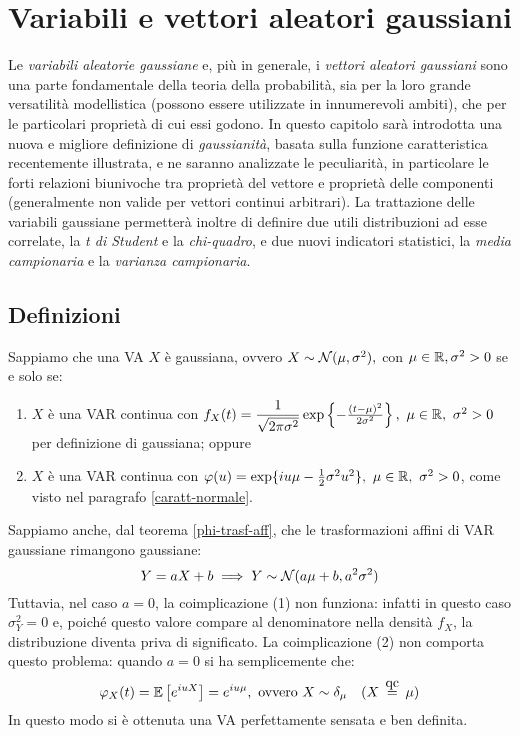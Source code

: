 \section{Variabili e vettori aleatori gaussiani}\label{variabli-vettori-gaussiani}
Le \emph{variabili aleatorie gaussiane} e, più in generale, i \emph{vettori aleatori gaussiani} sono una parte fondamentale della teoria della probabilità, sia per la loro grande versatilità modellistica (possono essere utilizzate in innumerevoli ambiti), che per le particolari proprietà di cui essi godono.
In questo capitolo sarà introdotta una nuova e migliore definizione di \emph{gaussianità}, basata sulla funzione caratteristica recentemente illustrata, e ne saranno analizzate le peculiarità, in particolare le forti relazioni biunivoche tra proprietà del vettore e proprietà delle componenti (generalmente non valide per vettori continui arbitrari).
La trattazione delle variabili gaussiane permetterà inoltre di definire due utili distribuzioni ad esse correlate, la \emph{\emph t di Student} e la \emph{chi-quadro}, e due nuovi indicatori statistici, la \emph{media campionaria} e la \emph{varianza campionaria}.

\subsection{Definizioni}
 Sappiamo che una VA $X$ è gaussiana, ovvero $X \sim \mathcal N(\mu, \sigma^2),$ con $\mu \in \mathbb R, \sigma^2 > 0$ se e solo se:
\begin{enumerate}
  \item $X$ è una VAR continua con $f_X(t) = \dfrac{1}{\sqrt{2\pi\sigma^2}}\exp\left\{-\frac{(t-\mu)^2}{2\sigma^2}\right\}, \ \mu \in \mathbb R, \ \sigma^2 > 0$ per definizione di gaussiana; oppure
  \item $X$ è una VAR continua con $\varphi(u) = \exp\{iu\mu-\frac{1}{2}\sigma^2u^2\}, \ \mu \in \mathbb R, \ \sigma^2 > 0$, come visto nel paragrafo \ref{caratt-normale}.
\end{enumerate}
Sappiamo anche, dal teorema \ref{phi-trasf-aff}, che le trasformazioni affini di VAR gaussiane rimangono gaussiane:
$$ Y = aX + b \implies Y \sim \mathcal N(a\mu+b,a^2\sigma^2)$$
Tuttavia, nel caso $a = 0$, la coimplicazione (1) non funziona: infatti in questo caso $\sigma_Y^2 = 0$ e, poiché questo valore compare al denominatore nella densità $f_X$, la distribuzione diventa priva di significato. La coimplicazione (2) non comporta questo problema: quando $a = 0$ si ha semplicemente che:
$$ \varphi_X(t) = \Ex{e^{iuX}} = e^{iu\mu}, \text{  ovvero } X \sim \delta_\mu \quad (X \aceq \mu)$$
In questo modo si è ottenuta una VA perfettamente sensata e ben definita.

